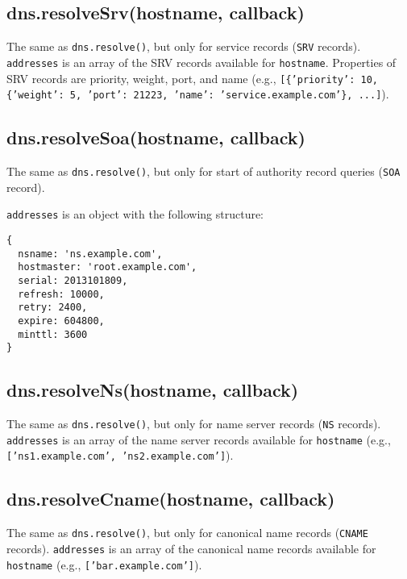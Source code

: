 \subsection{dns.resolveSrv(hostname,
callback)}\label{dns.resolvesrvhostname-callback}

The same as \texttt{dns.resolve()}, but only for service records
(\texttt{SRV} records). \texttt{addresses} is an array of the SRV
records available for \texttt{hostname}. Properties of SRV records are
priority, weight, port, and name (e.g.,
\texttt{{[}\{'priority': 10, \{'weight': 5, 'port': 21223, 'name': 'service.example.com'\}, ...{]}}).

\subsection{dns.resolveSoa(hostname,
callback)}\label{dns.resolvesoahostname-callback}

The same as \texttt{dns.resolve()}, but only for start of authority
record queries (\texttt{SOA} record).

\texttt{addresses} is an object with the following structure:

\begin{verbatim}
{
  nsname: 'ns.example.com',
  hostmaster: 'root.example.com',
  serial: 2013101809,
  refresh: 10000,
  retry: 2400,
  expire: 604800,
  minttl: 3600
}
\end{verbatim}

\subsection{dns.resolveNs(hostname,
callback)}\label{dns.resolvenshostname-callback}

The same as \texttt{dns.resolve()}, but only for name server records
(\texttt{NS} records). \texttt{addresses} is an array of the name server
records available for \texttt{hostname} (e.g.,
\texttt{{[}'ns1.example.com', 'ns2.example.com'{]}}).

\subsection{dns.resolveCname(hostname,
callback)}\label{dns.resolvecnamehostname-callback}

The same as \texttt{dns.resolve()}, but only for canonical name records
(\texttt{CNAME} records). \texttt{addresses} is an array of the
canonical name records available for \texttt{hostname} (e.g.,
\texttt{{[}'bar.example.com'{]}}).

